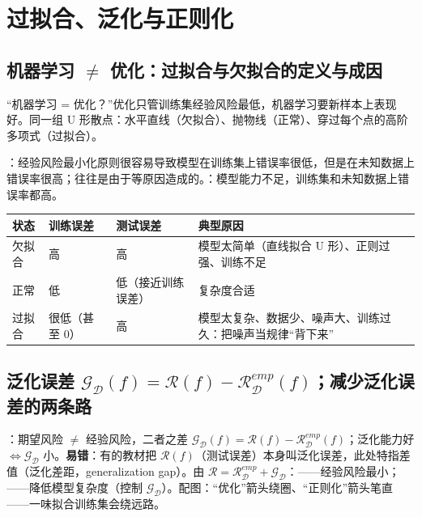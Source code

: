 \section{过拟合、泛化与正则化}

\subsection{机器学习 \texorpdfstring{$\neq$}{≠} 优化：过拟合与欠拟合的定义与成因}
“机器学习 = 优化？”优化只管训练集经验风险最低，机器学习要新样本上表现好。同一组 U 形散点：水平直线（欠拟合）、抛物线（正常）、穿过每个点的高阶多项式（过拟合）。
\begin{defn}[过拟合与欠拟合]
：经验风险最小化原则很容易导致模型在训练集上错误率很低，但是在未知数据上错误率很高；往往是由于等原因造成的。：模型能力不足，训练集和未知数据上错误率都高。
\end{defn}
\begin{center}\small
\begin{tabularx}{\linewidth}{@{}p{1.4cm}p{2.4cm}p{2.9cm}L@{}}
\toprule
状态 & 训练误差 & 测试误差 & 典型原因 \\
\midrule
欠拟合 & 高 & 高 & 模型太简单（直线拟合 U 形）、正则过强、训练不足 \\
正常 & 低 & 低（接近训练误差）& 复杂度合适 \\
过拟合 & 很低（甚至 0）& 高 & 模型太复杂、数据少、噪声大、训练过久：把噪声当规律“背下来” \\
\bottomrule
\end{tabularx}
\end{center}

\subsection{泛化误差 \texorpdfstring{$\mathcal G_{\mathcal D}(f)=\mathcal R(f)-\mathcal R^{emp}_{\mathcal D}(f)$}{G = R - Remp}；减少泛化误差的两条路}
：期望风险 $\neq$ 经验风险，二者之差 $\mathcal G_{\mathcal D}(f)=\mathcal R(f)-\mathcal R^{emp}_{\mathcal D}(f)$；泛化能力好 $\iff\mathcal G_{\mathcal D}$ 小。\textbf{易错}：有的教材把 $\mathcal R(f)$（测试误差）本身叫泛化误差，此处特指差值（泛化差距，generalization gap）。由 $\mathcal R=\mathcal R^{emp}_{\mathcal D}+\mathcal G_{\mathcal D}$：——经验风险最小；——降低模型复杂度（控制 $\mathcal G_{\mathcal D}$）。配图：“优化”箭头绕圈、“正则化”箭头笔直——一味拟合训练集会绕远路。

